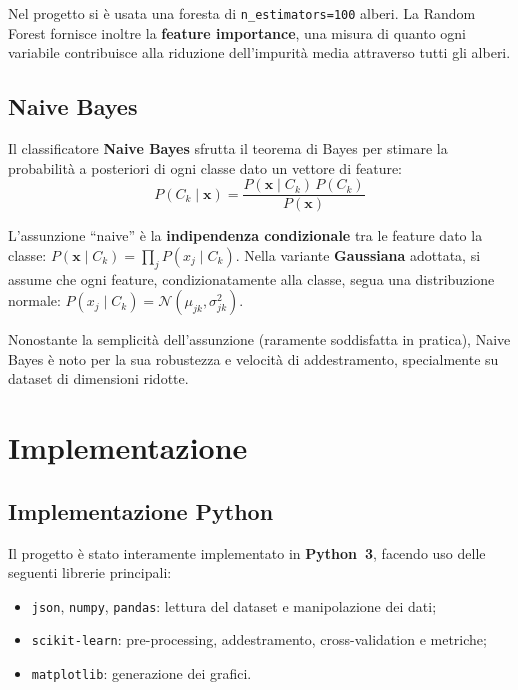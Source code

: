 \documentclass[12pt, a4paper]{article}
\begin{document}
Nel progetto si è usata una foresta di \texttt{n\_estimators=100} alberi.
La Random Forest fornisce inoltre la \textbf{feature importance}, una misura
di quanto ogni variabile contribuisce alla riduzione dell'impurità media
attraverso tutti gli alberi.

\subsection{Naive Bayes}

Il classificatore \textbf{Naive Bayes} sfrutta il teorema di Bayes per stimare
la probabilità a posteriori di ogni classe dato un vettore di feature:
\begin{equation}
  P(C_k \mid \mathbf{x}) = \frac{P(\mathbf{x} \mid C_k)\, P(C_k)}{P(\mathbf{x})}
\end{equation}

L'assunzione ``naive'' è la \textbf{indipendenza condizionale} tra le feature
dato la classe: $P(\mathbf{x} \mid C_k) = \prod_{j} P(x_j \mid C_k)$.
Nella variante \textbf{Gaussiana} adottata, si assume che ogni feature,
condizionatamente alla classe, segua una distribuzione normale:
$P(x_j \mid C_k) = \mathcal{N}(\mu_{jk}, \sigma_{jk}^2)$.

Nonostante la semplicità dell'assunzione (raramente soddisfatta in pratica),
Naive Bayes è noto per la sua robustezza e velocità di addestramento,
specialmente su dataset di dimensioni ridotte.

\section{Implementazione}

\subsection{Implementazione Python}

Il progetto è stato interamente implementato in \textbf{Python~3}, facendo uso
delle seguenti librerie principali:
\begin{itemize}
  \item \texttt{json}, \texttt{numpy}, \texttt{pandas}: lettura del dataset
        e manipolazione dei dati;
  \item \texttt{scikit-learn}: pre-processing, addestramento,
        cross-validation e metriche;
  \item \texttt{matplotlib}: generazione dei grafici.
\end{itemize}
\end{document}
